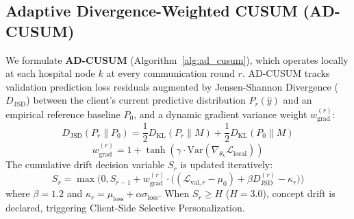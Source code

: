 \documentclass[10pt,a4paper,twocolumn,twoside]{article}
\begin{document}
\subsection{Adaptive Divergence-Weighted CUSUM (AD-CUSUM)}
We formulate \textbf{AD-CUSUM} (Algorithm~\ref{alg:ad_cusum}), which operates locally at each hospital node $k$ at every communication round $r$. AD-CUSUM tracks validation prediction loss residuals augmented by Jensen-Shannon Divergence ($D_{\text{JSD}}$) between the client's current predictive distribution $P_r(\hat{y})$ and an empirical reference baseline $P_0$, and a dynamic gradient variance weight $w_{\text{grad}}^{(r)}$:
\begin{equation}
D_{\text{JSD}}(P_r \parallel P_0) = \frac{1}{2} D_{\text{KL}}(P_r \parallel M) + \frac{1}{2} D_{\text{KL}}(P_0 \parallel M)
\end{equation}
\begin{equation}
w_{\text{grad}}^{(r)} = 1 + \tanh\left(\gamma \cdot \text{Var}\left(\nabla_{\theta_k} \mathcal{L}_{\text{local}}\right)\right)
\end{equation}
The cumulative drift decision variable $S_r$ is updated iteratively:
\begin{equation}
S_r = \max\Big(0, S_{r-1} + w_{\text{grad}}^{(r)} \cdot \big((\mathcal{L}_{\text{val}, r} - \mu_0) + \beta D_{\text{JSD}}^{(r)} - \kappa_r\big)\Big)
\end{equation}
where $\beta = 1.2$ and $\kappa_r = \mu_{\text{loss}} + \alpha \sigma_{\text{loss}}$. When $S_r \ge H$ ($H = 3.0$), concept drift is declared, triggering Client-Side Selective Personalization.
\end{document}
